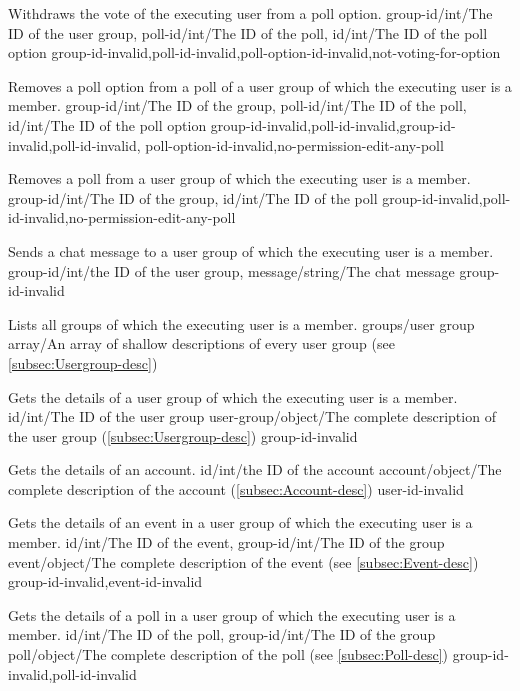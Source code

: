 \documentclass[parskip=full,11pt]{scrartcl}
\begin{document}
{Withdraws the vote of the executing user from a poll option.}
{group-id/int/The ID of the user group,
poll-id/int/The ID of the poll,
id/int/The ID of the poll option}
{}
{group-id-invalid,poll-id-invalid,poll-option-id-invalid,not-voting-for-option}
{}

{Removes a poll option from a poll of a user group of which the executing user
is a member.}
{group-id/int/The ID of the group,
poll-id/int/The ID of the poll,
id/int/The ID of the poll option}
{}
{group-id-invalid,poll-id-invalid,group-id-invalid,poll-id-invalid,
poll-option-id-invalid,no-permission-edit-any-poll}
{}

{Removes a poll from a user group of which the executing user is a member.}
{group-id/int/The ID of the group,
id/int/The ID of the poll}
{}
{group-id-invalid,poll-id-invalid,no-permission-edit-any-poll}
{}

{Sends a chat message to a user group of which the executing user is a member.}
{group-id/int/the ID of the user group,
message/string/The chat message}
{}
{group-id-invalid}
{}

{Lists all groups of which the executing user is a member.}
{}
{groups/user group array/An array of shallow descriptions of every user group
(see \ref{subsec:Usergroup-desc})}
{}
{}

{Gets the details of a user group of which the executing user is a member.}
{id/int/The ID of the user group}
{user-group/object/The complete description of the user group
(\ref{subsec:Usergroup-desc})}
{group-id-invalid}
{}

{Gets the details of an account.}
{id/int/the ID of the account}
{account/object/The complete description of the account
(\ref{subsec:Account-desc})}
{user-id-invalid}
{}

{Gets the details of an event in a user group of which the executing user is
a member.}
{id/int/The ID of the event,
group-id/int/The ID of the group}
{event/object/The complete description of the event (see \ref{subsec:Event-desc})}
{group-id-invalid,event-id-invalid}
{}

{Gets the details of a poll in a user group of which the executing user is
a member.}
{id/int/The ID of the poll,
group-id/int/The ID of the group}
{poll/object/The complete description of the poll (see \ref{subsec:Poll-desc})}
{group-id-invalid,poll-id-invalid}
{}
\end{document}
